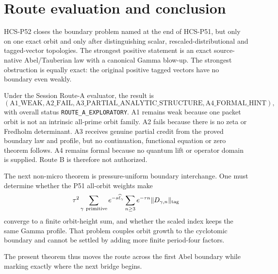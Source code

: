 \section{Route evaluation and conclusion}

HCS-P52 closes the boundary problem named at the end of HCS-P51, but only on
one exact orbit and only after distinguishing scalar, rescaled-distributional
and tagged-vector topologies.  The strongest positive statement is an exact
source-native Abel/Tauberian law with a canonical Gamma blow-up.  The
strongest obstruction is equally exact: the original positive tagged vectors
have no boundary even weakly.

Under the Session Route-A evaluator, the result is
\[
(\mathrm{A1\_WEAK},\mathrm{A2\_FAIL},
\mathrm{A3\_PARTIAL\_ANALYTIC\_STRUCTURE},
\mathrm{A4\_FORMAL\_HINT}),
\]
with overall status \texttt{ROUTE\_A\_EXPLORATORY}.  A1 remains weak because
one packet orbit is not an intrinsic all-prime orbit family.  A2 fails because
there is no zeta or Fredholm determinant.  A3 receives genuine partial credit
from the proved boundary law and profile, but no continuation, functional
equation or zero theorem follows.  A4 remains formal because no quantum lift
or operator domain is supplied.  Route B is therefore not authorized.

The next non-micro theorem is pressure-uniform boundary interchange.  One
must determine whether the P51 all-orbit weights make
\[
\tau^2\sum_{\gamma\ \mathrm{primitive}}
e^{-s\widehat\ell_\gamma}
\sum_{n\ge3}e^{-\tau n}\|D_{\gamma,n}\|_{\rm tag}
\]
converge to a finite orbit-height sum, and whether the scaled index keeps the
same Gamma profile.  That problem couples orbit growth to the cyclotomic
boundary and cannot be settled by adding more finite period-four factors.

The present theorem thus moves the route across the first Abel boundary while
marking exactly where the next bridge begins.
